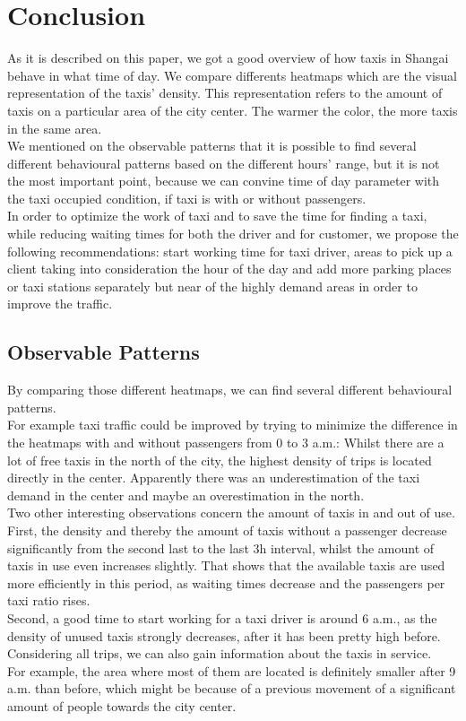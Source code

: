 \documentclass[11pt,conference,a4paper,twocolumns,romanappendices]{IEEEtran}
\begin{document}
\section{Conclusion}
As it is described on this paper, we got a good overview of how taxis in Shangai behave in what time of day. We compare differents heatmaps which are the visual representation of the taxis' density. This representation refers to the amount of taxis on a particular area of the city center. The warmer the color, the more taxis in the same area.
\\
We mentioned on the observable patterns that it is possible to find several different behavioural patterns based on the different hours' range, but it is not the most important point, because we can convine time of day parameter with the taxi occupied condition, if taxi is with or without passengers. 
\\
In order to optimize the work of taxi and to save the time for finding a taxi, while reducing waiting times for both the driver and for customer, we propose the following recommendations: start working time for taxi driver, areas to pick up a client taking into consideration the hour of the day and add more parking places or taxi stations separately but near of the highly demand areas in order to improve the traffic.


\subsection{Observable Patterns}
By comparing those different heatmaps, we can find several different behavioural patterns. \\
For example taxi traffic could be improved by trying to minimize the difference in the heatmaps with and without passengers from 0 to 3 a.m.: Whilst there are a lot of free taxis in the north of the city, the highest density of trips is located directly in the center. Apparently there was an underestimation of the taxi demand in the center and maybe an overestimation in the north. \\
Two other interesting observations concern the amount of taxis in and out of use. \\
First, the density and thereby the amount of taxis without a passenger decrease significantly from the second last to the last 3h interval, whilst the amount of taxis in use even increases slightly. That shows that the available taxis are used more efficiently in this period, as waiting times decrease and the passengers per taxi ratio rises. \\
Second, a good time to start working for a taxi driver is around 6 a.m., as the density of unused taxis strongly decreases, after it has been pretty high before. \\
Considering all trips, we can also gain information about the taxis in service. \\
For example, the area where most of them are located is definitely smaller after 9 a.m. than before, which might be because of a previous movement of a significant amount of people towards the city center. \\
\end{document}

